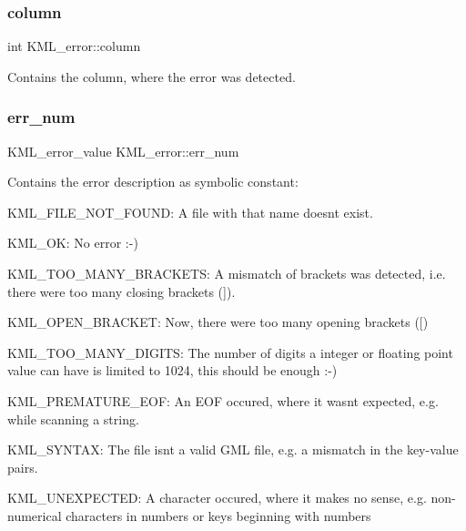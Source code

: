 \subsubsection{\texorpdfstring{column}{column}}
{\footnotesize\ttfamily int K\+M\+L\+\_\+error\+::column}

Contains the column, where the error was detected. \mbox{\label{struct_k_m_l__error_af529c360a62a01e2db8ed6b4a9ee0bf2}} 
\subsubsection{\texorpdfstring{err\+\_\+num}{err\_num}}
{\footnotesize\ttfamily K\+M\+L\+\_\+error\+\_\+value K\+M\+L\+\_\+error\+::err\+\_\+num}

Contains the error description as symbolic constant\+: 
\begin{DoxyItemize}
\item {\ttfamily K\+M\+L\+\_\+\+F\+I\+L\+E\+\_\+\+N\+O\+T\+\_\+\+F\+O\+U\+ND}\+: A file with that name doesn\textquotesingle{}t exist. 
\item {\ttfamily K\+M\+L\+\_\+\+OK}\+: No error \+:-\/) 
\item {\ttfamily K\+M\+L\+\_\+\+T\+O\+O\+\_\+\+M\+A\+N\+Y\+\_\+\+B\+R\+A\+C\+K\+E\+TS}\+: A mismatch of brackets was detected, i.\+e. there were too many closing brackets ({\ttfamily \mbox{]}}). 
\item {\ttfamily K\+M\+L\+\_\+\+O\+P\+E\+N\+\_\+\+B\+R\+A\+C\+K\+ET}\+: Now, there were too many opening brackets ({\ttfamily \mbox{[}}) 
\item {\ttfamily K\+M\+L\+\_\+\+T\+O\+O\+\_\+\+M\+A\+N\+Y\+\_\+\+D\+I\+G\+I\+TS}\+: The number of digits a integer or floating point value can have is limited to 1024, this should be enough \+:-\/) 
\item {\ttfamily K\+M\+L\+\_\+\+P\+R\+E\+M\+A\+T\+U\+R\+E\+\_\+\+E\+OF}\+: An E\+OF occured, where it wasn\textquotesingle{}t expected, e.\+g. while scanning a string. 
\item {\ttfamily K\+M\+L\+\_\+\+S\+Y\+N\+T\+AX}\+: The file isn\textquotesingle{}t a valid G\+ML file, e.\+g. a mismatch in the key-\/value pairs. 
\item {\ttfamily K\+M\+L\+\_\+\+U\+N\+E\+X\+P\+E\+C\+T\+ED}\+: A character occured, where it makes no sense, e.\+g. non-\/numerical characters in numbers or keys beginning with numbers 
\end{DoxyItemize}\mbox{\label{struct_k_m_l__error_a2598fe26a2482414d4305d3fbcb17929}} 

